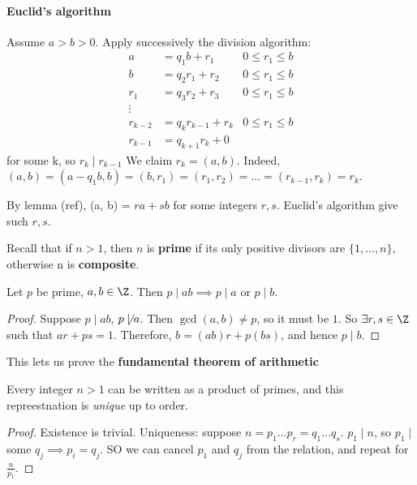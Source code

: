 \documentclass{article}
\begin{document}
\paragraph{Euclid's algorithm} Assume $a > b > 0$. Apply successively the division algorithm:
\begin{align*}
    a &= q_1 b + r_1 & 0 \leq r_1 \le b\\
    b &= q_2 r_1 + r_2 & 0 \leq r_1 \le b\\
    r_1 &= q_3 r_2 + r_3 & 0 \leq r_1 \le b\\
    \vdots \\
    r_{k-2} &= q_k r_{k-1} + r_k & 0 \leq r_1 \le b\\
    r_{k-1} &= q_{k+1} r_k + 0
\end{align*}
for some k, so $r_k \mid r_{k-1}$
We claim $r_k = (a, b)$. Indeed, $(a, b) = (a - q_1 b, b) = (b, r_1) = (r_1, r_2) = \dots = (r_{k-1}, r_k) = r_k$.
\begin{remark}
    By lemma (ref), (a, b) = $r a + s b$ for some integers $r, s$. Euclid's algorithm give such $r, s$.
\end{remark}
Recall that if $n > 1$, then $n$ is \textbf{prime} if its only positive divisors are $\{1, \dots, n\}$, otherwise n is \textbf{composite}.
\begin{nlemma}
    Let $p$ be prime, $a, b \in \Z$.  Then $p \mid ab \implies p \mid a$ or $p \mid b$.
\end{nlemma}
\begin{proof}
    Suppose $p \mid ab$, $p \not \mid a$. Then $\gcd(a, b) \ne p$, so it must be $1$. So $\exists r, s \in \Z$ such that $ar + ps = 1$.
    Therefore, $b = (ab) r + p(bs)$, and hence $p \mid b$.
\end{proof}

This lets us prove the \textbf{fundamental theorem of arithmetic}
\begin{thm}
    Every integer $n > 1$ can be written as a product of primes, and this repreestnation is \emph{unique} up to order.
\end{thm}
\begin{proof}
    Existence is trivial. Uniqueness: suppose $n = p_1 \dots p_r = q_1 \dots q_s$. $p_1 \mid n$, so $p_1 \mid $ some $q_j \implies p_i = q_j$. SO we can cancel $p_1$ and $q_j$ from the relation, and repeat for $\frac{n}{p_1}$.
\end{proof}
\end{document}
